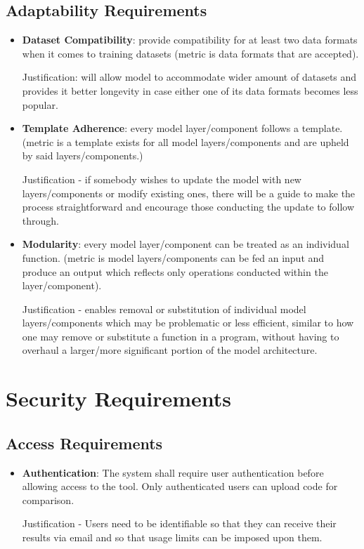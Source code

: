 \documentclass[12pt]{article}
\begin{document}
\subsection{Adaptability Requirements}
\begin{itemize}
    \item \textbf{Dataset Compatibility}: provide compatibility for at least 
    two data formats when it comes to training datasets (metric is data 
    formats that are accepted).

    Justification: will allow model to accommodate wider amount of datasets 
    and provides it better longevity in case either one of its data formats 
    becomes less popular.
    
    \item \textbf{Template Adherence}:  every model layer/component follows a 
    template. (metric is a template exists for all model layers/components and
     are upheld by said layers/components.)

    Justification - if somebody wishes to update the model with new 
    layers/components or modify existing ones, there will be a guide to make 
    the process straightforward and encourage those conducting the update to 
    follow through.

    \item \textbf{Modularity}:  every model layer/component can be treated as 
    an individual function. (metric is model layers/components can be fed an 
    input and produce an output which reflects only operations conducted within
     the layer/component).

    Justification - enables removal or substitution of individual model 
    layers/components which may be problematic or less efficient, similar to 
    how one may remove or substitute a function in a program, without having to
     overhaul a larger/more significant portion of the model architecture.


\end{itemize}

\section{Security Requirements}
\subsection{Access Requirements}
\begin{itemize}
    \item \textbf{Authentication}: The system shall require user authentication
    before allowing access to the tool. Only authenticated users can upload code for comparison.

    Justification - Users need to be identifiable so that they can receive their results via email and so that usage limits can be imposed upon them.
\end{itemize}
\end{document}
